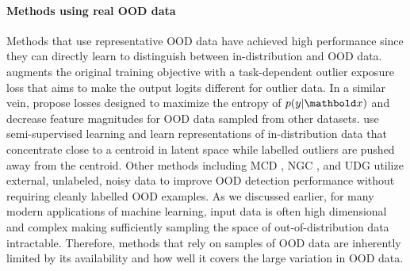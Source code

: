 \paragraph{Methods using real OOD data}
Methods that use representative OOD data have achieved high performance since they can directly learn to distinguish between in-distribution and OOD data. 
\textcite{hendrycks_deep_2019} augments the original training objective with a task-dependent outlier exposure loss that aims to make the output logits different for outlier data. 
In a similar vein, \textcite{dhamija_reducing_2018} propose losses designed to maximize the entropy of $p(y|\xb)$ and decrease feature magnitudes for OOD data sampled from other datasets. 
\textcite{ruff_deep_2020} use semi-supervised learning and learn representations of in-distribution data that concentrate close to a centroid in latent space while labelled outliers are pushed away from the centroid. 
Other methods including MCD \cite{yu_unsupervised_2019}, NGC \cite{wu_ngc_2021}, and UDG \cite{yang_semantically_2021} utilize external, unlabeled, noisy data to improve OOD detection performance without requiring cleanly labelled OOD examples.
As we discussed earlier, for many modern applications of machine learning, input data is often high dimensional and complex making sufficiently sampling the space of out-of-distribution data intractable. 
Therefore, methods that rely on samples of OOD data are inherently limited by its availability and how well it covers the large variation in OOD data. 

